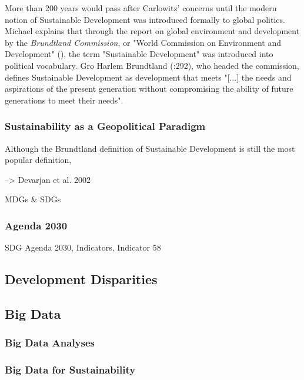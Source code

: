 		        More than 200 years would pass after Carlowitz' concerns until the modern notion of Sustainable Development was introduced formally to global politics. Michael \citet{redclift2005} explains that through the report on global environment and development by the \textit{Brundtland Commission}, or "World Commission on Environment and Development" (\citeyear{wced1987}), the term "Sustainable Development" was introduced into political vocabulary. Gro Harlem Brundtland (\citeyear{brundtland1987}:292),  who headed the commission, defines Sustainable Development as development that meets "[...] the needs and aspirations of the present generation without compromising the ability of future generations to meet their needs".
		        
		        
		    
		    \subsubsection{Sustainability as a Geopolitical Paradigm}
		        Although the Brundtland definition of Sustainable Development is still the most popular definition, 
		        
		        --> Devarjan et al. 2002
		        
		        MDGs & SDGs
		        
		    
		    \subsubsection{Agenda 2030}
		        SDG Agenda 2030, Indicators, Indicator 58
		
		
		\subsection{Development Disparities}
		
		
		
		\subsection{Big Data}
			\subsubsection{Big Data Analyses}
			
			\subsubsection{Big Data for Sustainability}
			

